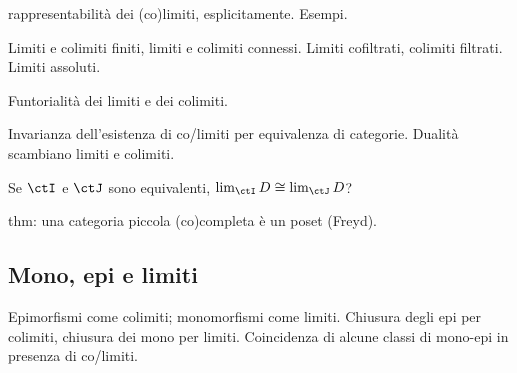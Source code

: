 rappresentabilità dei (co)limiti, esplicitamente.
Esempi.

Limiti e colimiti finiti, limiti e colimiti connessi.
Limiti cofiltrati, colimiti filtrati.
Limiti assoluti.

Funtorialità dei limiti e dei colimiti.

Invarianza dell'esistenza di co/limiti per equivalenza di categorie. Dualità scambiano limiti e colimiti.

Se \(\ctI\) e \(\ctJ\) sono equivalenti, \(\lim_\ctI D\cong\lim_\ctJ D\)?

thm: una categoria piccola (co)completa è un poset (Freyd).

\subsection{Mono, epi e limiti}
Epimorfismi come colimiti; monomorfismi come limiti. Chiusura degli epi per colimiti, chiusura dei mono per limiti. Coincidenza di alcune classi di mono-epi in presenza di co/limiti.

